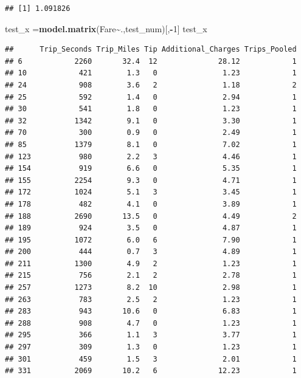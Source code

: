 \documentclass[
]{article}
\newenvironment{Shaded}{\begin{snugshade}}{\end{snugshade}}
\newcommand{\DecValTok}[1]{\textcolor[rgb]{0.00,0.00,0.81}{#1}}
\newcommand{\FunctionTok}[1]{\textcolor[rgb]{0.13,0.29,0.53}{\textbf{#1}}}
\newcommand{\NormalTok}[1]{#1}
\newcommand{\OtherTok}[1]{\textcolor[rgb]{0.56,0.35,0.01}{#1}}
\newcommand{\SpecialCharTok}[1]{\textcolor[rgb]{0.81,0.36,0.00}{\textbf{#1}}}
\begin{document}
\begin{verbatim}
## [1] 1.091826
\end{verbatim}

\begin{Shaded}
\begin{Highlighting}[]
\NormalTok{test\_x }\OtherTok{=}\FunctionTok{model.matrix}\NormalTok{(Fare}\SpecialCharTok{\textasciitilde{}}\NormalTok{.,test\_num)[,}\SpecialCharTok{{-}}\DecValTok{1}\NormalTok{]}
\NormalTok{test\_x}
\end{Highlighting}
\end{Shaded}

\begin{verbatim}
##      Trip_Seconds Trip_Miles Tip Additional_Charges Trips_Pooled
## 6            2260       32.4  12              28.12            1
## 10            421        1.3   0               1.23            1
## 24            908        3.6   2               1.18            2
## 25            592        1.4   0               2.94            1
## 30            541        1.8   0               1.23            1
## 32           1342        9.1   0               3.30            1
## 70            300        0.9   0               2.49            1
## 85           1379        8.1   0               7.02            1
## 123           980        2.2   3               4.46            1
## 154           919        6.6   0               5.35            1
## 155          2254        9.3   0               4.71            1
## 172          1024        5.1   3               3.45            1
## 178           482        4.1   0               3.89            1
## 188          2690       13.5   0               4.49            2
## 189           924        3.5   0               4.87            1
## 195          1072        6.0   6               7.90            1
## 200           444        0.7   3               4.89            1
## 211          1300        4.9   2               1.23            1
## 215           756        2.1   2               2.78            1
## 257          1273        8.2  10               2.98            1
## 263           783        2.5   2               1.23            1
## 283           943       10.6   0               6.83            1
## 288           908        4.7   0               1.23            1
## 295           366        1.1   3               3.77            1
## 297           309        1.3   0               1.23            1
## 301           459        1.5   3               2.01            1
## 331          2069       10.2   6              12.23            1

\end{verbatim}
\end{document}

